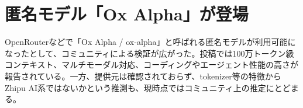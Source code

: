 \section{匿名モデル「Ox Alpha」が登場}
OpenRouterなどで「Ox Alpha / ox-alpha」と呼ばれる匿名モデルが利用可能になったとして、コミュニティによる検証が広がった。投稿では100万トークン級コンテキスト、マルチモーダル対応、コーディングやエージェント性能の高さが報告されている。一方、提供元は確認されておらず、tokenizer等の特徴からZhipu AI系ではないかという推測も、現時点ではコミュニティ上の推定にとどまる。
